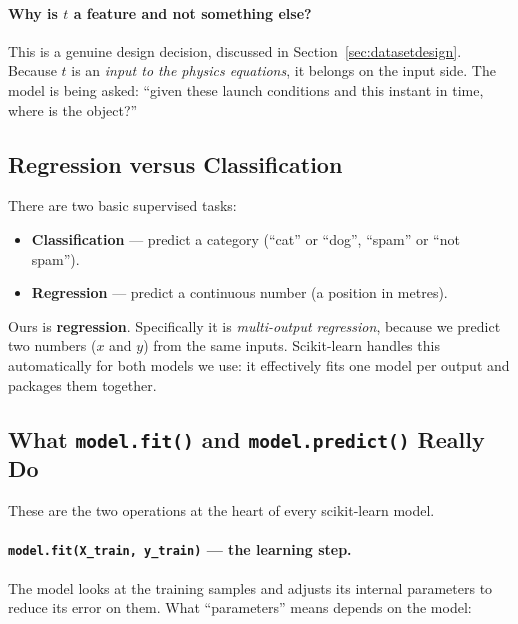\documentclass[11pt,a4paper]{article}
\begin{document}
\paragraph{Why is $t$ a feature and not something else?}
This is a genuine design decision, discussed in Section~\ref{sec:datasetdesign}. Because $t$ is an
\emph{input to the physics equations}, it belongs on the input side. The model is being asked:
``given these launch conditions and this instant in time, where is the object?''

\subsection{Regression versus Classification}

There are two basic supervised tasks:
\begin{itemize}[leftmargin=2em,itemsep=0.1em]
  \item \textbf{Classification} --- predict a category (``cat'' or ``dog'', ``spam'' or ``not spam'').
  \item \textbf{Regression} --- predict a continuous number (a position in metres).
\end{itemize}

Ours is \textbf{regression}. Specifically it is \emph{multi-output regression}, because we predict
two numbers ($x$ and $y$) from the same inputs. Scikit-learn handles this automatically for both
models we use: it effectively fits one model per output and packages them together.

\subsection{What \texttt{model.fit()} and \texttt{model.predict()} Really Do}\label{sec:fitpredict}

These are the two operations at the heart of every scikit-learn model.

\paragraph{\texttt{model.fit(X\_train, y\_train)} --- the learning step.}
The model looks at the training samples and adjusts its internal parameters to reduce its error on
them. What ``parameters'' means depends on the model:
\end{document}
